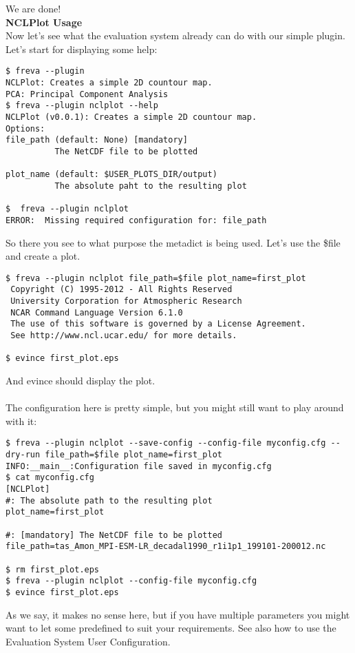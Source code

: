 \documentclass[a4paper,11pt]{ltxdoc}
\begin{document}
We are done!
\\
\textbf{NCLPlot Usage}\\
Now let's see what the evaluation system already can do with our simple plugin. \\
Let's start for displaying some help:
\begin{lstlisting}
$ freva --plugin
NCLPlot: Creates a simple 2D countour map.
PCA: Principal Component Analysis
$ freva --plugin nclplot --help
NCLPlot (v0.0.1): Creates a simple 2D countour map.
Options:
file_path (default: None) [mandatory]
          The NetCDF file to be plotted

plot_name (default: $USER_PLOTS_DIR/output)
          The absolute paht to the resulting plot

$  freva --plugin nclplot
ERROR:  Missing required configuration for: file_path
\end{lstlisting}
So there you see to what purpose the metadict is being used. Let's use the \$file and create a plot.
\begin{lstlisting}
$ freva --plugin nclplot file_path=$file plot_name=first_plot
 Copyright (C) 1995-2012 - All Rights Reserved
 University Corporation for Atmospheric Research
 NCAR Command Language Version 6.1.0
 The use of this software is governed by a License Agreement.
 See http://www.ncl.ucar.edu/ for more details.

$ evince first_plot.eps
\end{lstlisting}
And evince should display the plot. \\
\\
The configuration here is pretty simple, but you might still want to play around with it:
\begin{lstlisting}
$ freva --plugin nclplot --save-config --config-file myconfig.cfg --dry-run file_path=$file plot_name=first_plot
INFO:__main__:Configuration file saved in myconfig.cfg
$ cat myconfig.cfg 
[NCLPlot]
#: The absolute path to the resulting plot
plot_name=first_plot

#: [mandatory] The NetCDF file to be plotted
file_path=tas_Amon_MPI-ESM-LR_decadal1990_r1i1p1_199101-200012.nc

$ rm first_plot.eps
$ freva --plugin nclplot --config-file myconfig.cfg
$ evince first_plot.eps
\end{lstlisting}
As we say, it makes no sense here, but if you have multiple parameters you might want to let some predefined to suit your requirements.
See also how to use the Evaluation System User Configuration.\\
\end{document}
